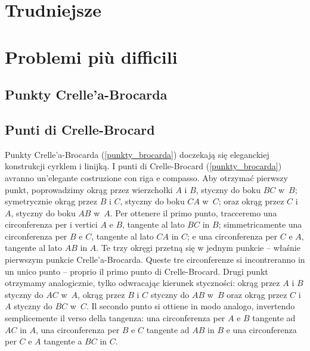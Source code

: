 
%

\section{Trudniejsze} %
\section{Problemi più difficili} %





\subsection{Punkty Crelle'a-Brocarda} %
\subsection{Punti di Crelle-Brocard} %

Punkty Crelle'a-Brocarda (\ref{punkty_brocarda}) doczekają się eleganckiej konstrukcji cyrklem i linijką. %
I punti di Crelle-Brocard (\ref{punkty_brocarda}) avranno un'elegante costruzione con riga e compasso. %
Aby otrzymać pierwszy punkt, poprowadzimy okrąg przez wierzchołki $A$ i $B$, styczny do boku $BC$ w~$B$; symetrycznie okrąg przez $B$ i $C$, styczny do boku $CA$ w~$C$; oraz okrąg przez $C$ i $A$, styczny do boku $AB$ w~$A$. %
Per ottenere il primo punto, tracceremo una circonferenza per i vertici $A$ e $B$, tangente al lato $BC$ in $B$; simmetricamente una circonferenza per $B$ e $C$, tangente al lato $CA$ in $C$; e una circonferenza per $C$ e $A$, tangente al lato $AB$ in $A$. %
Te trzy okręgi przetną się w jednym punkcie -- właśnie pierwszym punkcie Crelle'a-Brocarda. %
Queste tre circonferenze si incontreranno in un unico punto -- proprio il primo punto di Crelle-Brocard. %
Drugi punkt otrzymamy analogicznie, tylko odwracając kierunek styczności: okrąg przez $A$ i $B$ styczny do $AC$ w~$A$, okrąg przez $B$ i $C$ styczny do $AB$ w~$B$ oraz okrąg przez $C$ i $A$ styczny do $BC$ w~$C$. %
Il secondo punto si ottiene in modo analogo, invertendo semplicemente il verso della tangenza: una circonferenza per $A$ e $B$ tangente ad $AC$ in $A$, una circonferenza per $B$ e $C$ tangente ad $AB$ in $B$ e una circonferenza per $C$ e $A$ tangente a $BC$ in $C$. %

